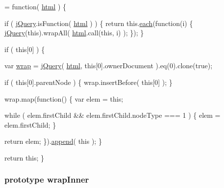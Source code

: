 \begin{DoxyCode}
= \textcolor{keyword}{function}( \hyperlink{jquery-1_810_82-vsdoc_8js_a54a716632718016dd4e400e83a0970e2}{html} ) \{


        \textcolor{keywordflow}{if} ( \hyperlink{jquery-1_810_82-vsdoc_8js_add5237586d970a38a81f990e8eb28c6c}{jQuery}.isFunction( \hyperlink{jquery-1_810_82-vsdoc_8js_a54a716632718016dd4e400e83a0970e2}{html} ) ) \{
            \textcolor{keywordflow}{return} this.\hyperlink{jquery-1_810_82-vsdoc_8js_aae0bcb6b00035445a8f9b262c96ea8a2}{each}(\textcolor{keyword}{function}(i) \{
                \hyperlink{jquery-1_810_82-vsdoc_8js_add5237586d970a38a81f990e8eb28c6c}{jQuery}(\textcolor{keyword}{this}).wrapAll( \hyperlink{jquery-1_810_82-vsdoc_8js_a54a716632718016dd4e400e83a0970e2}{html}.call(\textcolor{keyword}{this}, i) );
            \});
        \}

        \textcolor{keywordflow}{if} ( \textcolor{keyword}{this}[0] ) \{
            
            var \hyperlink{jquery-1_810_82-vsdoc_8js_a75991b1c3d71522ced1bf65ab3b07902}{wrap} = \hyperlink{jquery-1_810_82-vsdoc_8js_add5237586d970a38a81f990e8eb28c6c}{jQuery}( \hyperlink{jquery-1_810_82-vsdoc_8js_a54a716632718016dd4e400e83a0970e2}{html}, \textcolor{keyword}{this}[0].ownerDocument ).eq(0).clone(\textcolor{keyword}{true});

            \textcolor{keywordflow}{if} ( \textcolor{keyword}{this}[0].parentNode ) \{
                wrap.insertBefore( \textcolor{keyword}{this}[0] );
            \}

            wrap.map(\textcolor{keyword}{function}() \{
                var elem = \textcolor{keyword}{this};

                \textcolor{keywordflow}{while} ( elem.firstChild && elem.firstChild.nodeType === 1 ) \{
                    elem = elem.firstChild;
                \}

                \textcolor{keywordflow}{return} elem;
            \}).\hyperlink{jquery-1_810_82-vsdoc_8js_a6b9ad5e0cf5c7480e9a327c771349a90}{append}( \textcolor{keyword}{this} );
        \}

        \textcolor{keywordflow}{return} \textcolor{keyword}{this};
    \}
\end{DoxyCode}
\hypertarget{jquery-1_810_82-vsdoc_8js_a41a3e550d6fe55baac11c61ed710ec2a}{
\subsubsection[{wrap\-Inner}]{ {\bf prototype} wrap\-Inner}}\label{jquery-1_810_82-vsdoc_8js_a41a3e550d6fe55baac11c61ed710ec2a}
